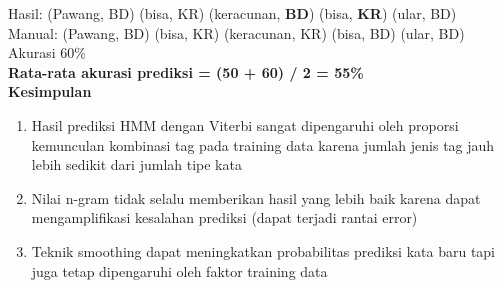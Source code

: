 \documentclass[paper=a4, fontsize=11pt]{scrartcl} %
\numberwithin{equation}{section} %
\numberwithin{figure}{section} %
\numberwithin{table}{section} %
\begin{document}
Hasil: (Pawang, BD) (bisa, KR) (keracunan, \textbf{BD}) (bisa, \textbf{KR}) (ular, BD) \\
Manual: (Pawang, BD) (bisa, KR) (keracunan, KR) (bisa, BD) (ular, BD) \\
Akurasi 60\% \\

\textbf{Rata-rata akurasi prediksi = (50 + 60) / 2 = 55\%} \\

\textbf{Kesimpulan}
\begin{enumerate}
	\item Hasil prediksi HMM dengan Viterbi sangat dipengaruhi oleh proporsi kemunculan kombinasi tag pada training data karena jumlah jenis tag jauh lebih sedikit dari jumlah tipe kata
	\item Nilai n-gram tidak selalu memberikan hasil yang lebih baik karena dapat mengamplifikasi kesalahan prediksi (dapat terjadi rantai error)
	\item Teknik smoothing dapat meningkatkan probabilitas prediksi kata baru tapi juga tetap dipengaruhi oleh faktor training data
\end{enumerate}	
\end{document}
